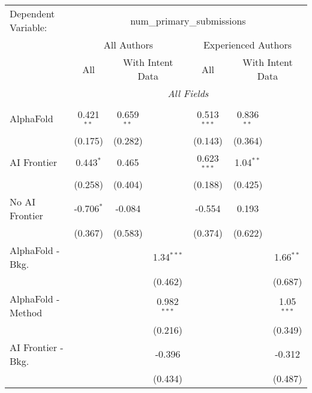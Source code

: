 \begingroup
\centering
\begin{tabular}{lcccccc}
   \tabularnewline \midrule \midrule
   Dependent Variable: & \multicolumn{6}{c}{num\_primary\_submissions}\\
 & \multicolumn{3}{c}{All Authors} & \multicolumn{3}{c}{Experienced Authors} \\
\cmidrule(lr){2-4} \cmidrule(lr){5-7}
 & \multicolumn{1}{c}{All} & \multicolumn{2}{c}{With Intent Data} & \multicolumn{1}{c}{All} & \multicolumn{2}{c}{With Intent Data} \\
\cmidrule(lr){2-2} \cmidrule(lr){3-4} \cmidrule(lr){5-5} \cmidrule(lr){6-7}
 & \multicolumn{6}{c}{\textit{All Fields}} \\ \\
   AlphaFold               & 0.421$^{**}$ & 0.659$^{**}$ &               & 0.513$^{***}$ & 0.836$^{**}$ &   \\   
                           & (0.175)      & (0.282)      &               & (0.143)       & (0.364)      &   \\   
   AI Frontier             & 0.443$^{*}$  & 0.465        &               & 0.623$^{***}$ & 1.04$^{**}$  &   \\   
                           & (0.258)      & (0.404)      &               & (0.188)       & (0.425)      &   \\   
   No AI Frontier          & -0.706$^{*}$ & -0.084       &               & -0.554        & 0.193        &   \\   
                           & (0.367)      & (0.583)      &               & (0.374)       & (0.622)      &   \\   
   AlphaFold - Bkg.        &              &              & 1.34$^{***}$  &               &              & 1.66$^{**}$\\   
                           &              &              & (0.462)       &               &              & (0.687)\\   
   AlphaFold - Method      &              &              & 0.982$^{***}$ &               &              & 1.05$^{***}$\\   
                           &              &              & (0.216)       &               &              & (0.349)\\   
   AI Frontier - Bkg.      &              &              & -0.396        &               &              & -0.312\\   
                           &              &              & (0.434)       &               &              & (0.487)\\   

\end{tabular}
